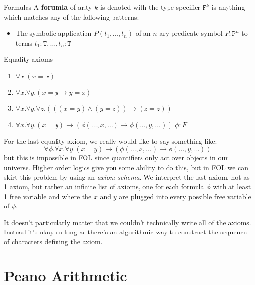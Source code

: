 \documentclass[10pt]{article}
\newcommand{\type}[1]{\texttt{#1}}
\begin{document}
	\begin{definition}{Formulas}{}
		A {\bf forumla} of arity-$k$ is denoted with the type specifier $\type{F}^k$ is anything which matches any of the following patterns:
		\begin{itemize}[itemsep=0pt]
			\item The symbolic application $P(t_1,\ldots,t_n)$ of an $n$-ary predicate symbol $P:\type{P}^n$ to terms $t_1:\type{T},\ldots,t_n:\type{T}$
		\end{itemize}
	\end{definition}
	
	
	Equality axioms
	
	\begin{tcolorbox}[colback=green!5!white,colframe=green!75!black,title={\bf Axioms of equality}]
		\begin{enumerate}[itemsep=0pt, label={E.\arabic*}]
			\item $\forall x. (x = x)$ \label{ax:eq-refl}
			\item $\forall x. \forall y. (x=y \to y=x)$ \label{ax:eq-sym}
			\item $\forall x. \forall y. \forall z. (((x=y) \land (y=z)) \to (z=z))$ \label{ax:eq-trans} 
			\item $\forall x. \forall y. (x = y) \to (\phi(\dots,x,\ldots) \to \phi(\ldots,y,\ldots))$ \hfill $\phi:F$
		\end{enumerate}
	\end{tcolorbox}

	\noindent
	
	For the last equality axiom, we really would like to say something like:
	$$\forall \phi. \forall x. \forall y. (x = y) \to (\phi(\dots,x,\ldots) \to \phi(\ldots,y,\ldots))$$
	but this is impossible in FOL since quantifiers only act over objects in our universe.
	Higher order logics give you some ability to do this, but in FOL we can skirt this problem by using an \emph{axiom schema}.
	We interpret the last axiom. not as 1 axiom, but rather an infinite list of axioms, one for each formula $\phi$ with at least 1 free variable and where the $x$ and $y$ are plugged into every possible free variable of $\phi$.
	
	It doesn't particularly matter that we couldn't technically write all of the axioms.
	Instead it's okay so long as there's an algorithmic way to construct the sequence of characters defining the axiom.
	 
	\section{Peano Arithmetic}
	
\end{document}
